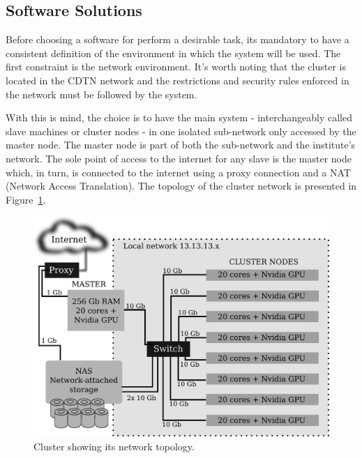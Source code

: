 \documentclass[twoside,a4paper,12pt,english]{inac19}
\begin{document}
\subsection{Software Solutions}
\label{sub:ssol}

Before choosing a software for perform a desirable task, its mandatory to have a consistent definition of the environment
in which the system will be used. The first constraint is the network environment. It's worth noting that the cluster is
located in the CDTN network and the restrictions and security rules enforced in the network must be followed by the system.

With this is mind, the choice is to have the main system - interchangeably called slave machines or cluster nodes - in one isolated sub-network only accessed by
the master node. The master node is part of both the sub-network and the institute's network. The sole point of access to the
internet for any slave is the master node which, in turn, is connected to the internet using a proxy connection and a
NAT (Network Access Translation). The topology of the cluster network is presented in Figure~\ref{fig:esquema-cluster}.

\begin{figure}[h] %
  \centering\includegraphics[scale=0.7]{images/cluster-rede.png}
  \caption{Cluster showing its network topology.}
  \label{fig:esquema-cluster}
\end{figure}
\end{document}
